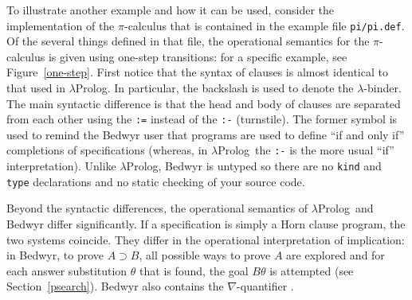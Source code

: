 \documentclass{article}
\newcommand{\lp}{$\lambda$Prolog}
\begin{document}
To illustrate another example and how it
can be used, consider the implementation of the $\pi$-calculus that is
contained in the example file \verb+pi/pi.def+.  Of the several
things defined in that file, the operational semantics for the
$\pi$-calculus is given using one-step transitions: for a specific
example, see Figure~\ref{one-step}.  First notice that the syntax of
clauses is almost identical to that used in $\lambda$Prolog.  In
particular, the backslash is used to denote the $\lambda$-binder.  The
main syntactic difference is that the head and body of clauses are
separated from each other using the \verb+:=+ instead of the
\verb+:-+ (turnstile).  The former symbol is used to remind
the Bedwyr user that programs are used to define ``if and only if''
completions of specifications (whereas, in \lp\ the \verb+:-+ is the
more usual ``if'' interpretation).  Unlike \lp, Bedwyr is
untyped so there are no {\tt kind} and {\tt type} declarations and no
static checking of your source code.  

Beyond the syntactic differences, the operational semantics of \lp\
and Bedwyr differ significantly.  If a specification is simply a Horn
clause program, the two systems coincide. They differ in the operational
interpretation of implication: in Bedwyr, to prove $A\supset B$, all 
possible ways to prove $A$ are explored and 
for each answer substitution $\theta$ that is found, the goal
$B\theta$ is attempted (see Section~\ref{psearch}).  Bedwyr also
contains the $\nabla$-quantifier \cite{miller05tocl}. 
\end{document}
